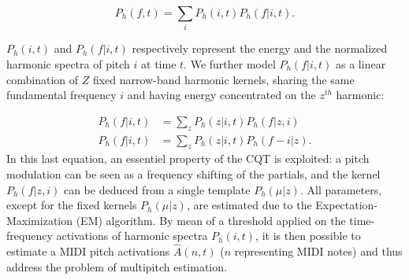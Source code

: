 \documentclass{article}
\begin{document}
\vspace{0.2cm}

\begin{equation}
P_h(f,t) = \sum_i P_h(i,t)P_h(f|i,t).
\end{equation} 

$P_h(i,t)$ and $P_h(f|i,t)$ respectively represent the energy and the normalized harmonic spectra of pitch $i$ at time $t$. We further model $P_h(f|i,t)$ as a linear combination of $Z$ fixed narrow-band harmonic kernels, sharing the same fundamental frequency $i$ and having energy concentrated on the $z^{th}$ harmonic:

\begin{align}
P_h(f|i,t) & = \sum_z P_h(z|i,t)P_h(f|z,i) \\
P_h(f|i,t) & = \sum_z P_h(z|i,t)P_h(f-i|z).
\end{align}
In this last equation, an essentiel property of the CQT is exploited: a pitch modulation can be seen as a frequency shifting of the partials, and the kernel $P_h(f|z,i)$ can be deduced from a single template $P_h(\mu|z)$.
All parameters, except for the fixed kernels $P_h(\mu|z)$, are estimated due to the Expectation-Maximization (EM) algorithm. By mean of a threshold applied on the time-frequency activations of harmonic spectra $P_h(i,t)$, it is then possible to estimate a MIDI pitch activations $\hat{A}(n,t)$ ($n$ representing MIDI notes) and thus address the problem of multipitch estimation.


\end{document}
